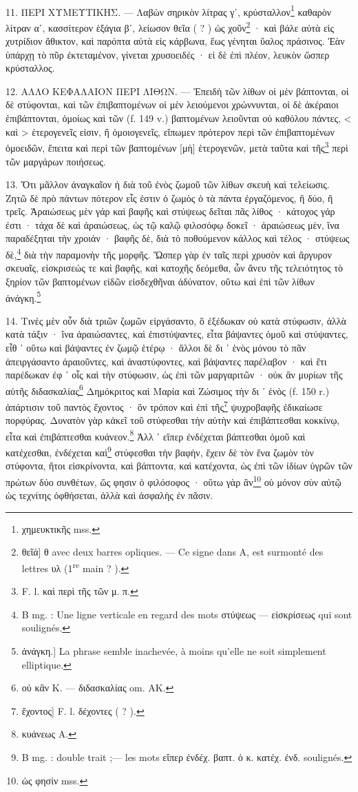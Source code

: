 \documentclass[a4paper, 11pt, oneside, polutonikogreek, french]{article}
\begin{document}
\paragraph{}
11. ΠΕΡΙ ΧΥΜΕΥΤΙΚΗΣ. --- Λαβὼν σηρικὸν λίτρας γʹ, κρύσταλλον\footnote{χημευκτικῆς mss.} καθαρὸν λίτραν αʹ, κασσίτερον ἑξάγια βʹ, λείωσον θεῖα ( ? ) ὡς χοῦν\footnote{θεῖά] θ avec deux barres opliques. --- Ce signe dans A, est surmonté des lettres υλ (1\textsuperscript{re} main ? ).} · καὶ βάλε αὐτὰ εἰς χυτρίδιον ἄθικτον, καὶ παρόπτα αὐτὰ εἰς κάρβωνα, ἕως γένηται ὕαλος πράσινος. Ἐὰν ὑπάρχῃ τὸ πῦρ ἐκτεταμένον, γίνεται χρυσοειδές · εἰ δὲ ἐπὶ πλέον, λευκὸν ὥσπερ κρύσταλλος.

12. ΑΛΛΟ ΚΕΦΑΛΑΙΟΝ ΠΕΡΙ ΛΙΘΩΝ. --- Ἐπειδὴ τῶν λίθων οἱ μὲν βάπτονται, οἱ δὲ στύφονται, καὶ τῶν ἐπιβαπτομένων οἱ μὲν λειούμενοι χρώννυνται, οἱ δὲ ἀκέραιοι ἐπιβάπτονται, ὁμοίως καὶ τῶν (f. 149 v.) βαπτομένων λειοῦνται οὐ καθόλου πάντες, < καὶ > ἑτερογενεῖς εἰσιν, ἢ ὁμοιογενεῖς, εἴπωμεν πρότερον περὶ τῶν ἐπιβαπτομένων ὁμοειδῶν, ἔπειτα καὶ περὶ τῶν βαπτομένων [μὴ] ἑτερογενῶν, μετὰ ταῦτα καὶ τῆς\footnote{F. l. καὶ περὶ τῆς τῶν μ. π.} περὶ τῶν μαργάρων ποιήσεως.

13. Ὅτι μᾶλλον ἀναγκαῖον ἡ διὰ τοῦ ἐνὸς ζωμοῦ τῶν λίθων σκευὴ καὶ τελείωσις. Ζητῶ δὲ πρὸ πάντων πότερον εἷς ἐστιν ὁ ζωμὸς ὁ τὰ πάντα ἐργαζόμενος, ἢ δύο, ἢ τρεῖς. Ἀραιώσεως μὲν γάρ καὶ βαφῆς καὶ στύψεως δεῖται πᾶς λίθος · κάτοχος γάρ ἐστι · τάχα δὲ καὶ ἀραιώσεως, ὡς τῷ καλῷ φιλοσόφῳ δοκεῖ · ἀραιώσεως μὲν, ἵνα παραδέξηται τὴν χροιάν · βαφῆς δὲ, διὰ τὸ ποθούμενον κάλλος καὶ τέλος · στύψεως δὲ,\footnote{B mg. : Une ligne verticale en regard des mots στύψεως --- εἰσκρίσεως qui sont soulignés.} διὰ τὴν παραμονὴν τῆς μορφῆς. Ὥσπερ γὰρ ἐν ταῖς περὶ χρυσὸν καὶ ἄργυρον σκευαῖς, εἰσκρισεώς τε καὶ βαφῆς, καὶ κατοχῆς δεόμεθα, ὧν ἄνευ τῆς τελειότητος τὸ ξηρίον τῶν βαπτομένων εἰδῶν εἰσδεχθῆναι ἀδύνατον, οὕτω καὶ ἐπὶ τῶν λίθων ἀνάγκη.\footnote{ἀνάγκη.] La phrase semble inachevée, à moins qu'elle ne soit simplement elliptique.}

14. Τινὲς μὲν οὖν διὰ τριῶν ζωμῶν εἰργάσαντο, ὃ ἐξέδωκαν οὐ κατὰ στύφωσιν, ἀλλὰ κατὰ τάξιν · ἵνα ἀραιώσαντες, καὶ ἐπιστύψαντες, εἶτα βάψαντες ὁμοῦ καὶ στύψαντες, εἶθ ᾽ οὕτω καὶ βάψαντες ἐν ζωμῷ ἑτέρῳ · ἄλλοι δὲ δι ᾽ ἑνὸς μόνου τὸ πᾶν ἀπειργάσαντο ἀραιοῦντες, καὶ ἀναστύφοντες, καὶ βάψαντες παρέλαβον · καὶ ἔτι παρέδωκαν ἐφ ᾽ οἷς καὶ τὴν στύφωσιν, ὡς ἐπὶ τῶν μαργαριτῶν · οὐκ ἂν μυρίων τῆς αὐτῆς διδασκαλίας\footnote{οὐ κἂν K. --- διδασκαλίας om. AK.} Δημόκριτος καὶ Μαρία καὶ Ζώσιμος τὴν δι ᾽ ἑνὸς (f. 150 r.) ἀπάρτισιν τοῦ παντὸς ἔχοντος · ὃν τρόπον καὶ ἐπὶ τῆς\footnote{ἔχοντος] F. l. δέχοντες ( ? ).} ψυχροβαφῆς ἐδικαίωσε πορφύρας. Δυνατὸν γὰρ κἀκεῖ τοῦ στύφεσθαι τὴν αὐτὴν καὶ ἐπιβάπτεσθαι κοκκίνῳ, εἶτα καὶ ἐπιβάπτεσθαι κυάνεον.\footnote{κυάνεως A.} Ἀλλ ᾽ εἴπερ ἐνδέχεται βάπτεσθαι ὁμοῦ καὶ κατέχεσθαι, ἐνδέχεται καὶ\footnote{B mg. : double trait ;--- les mots εἴπερ ἐνδέχ. βαπτ. ὁ κ. κατέχ. ἐνδ. soulignés.} στύφεσθαι τὴν βαφὴν, ἔχειν δὲ τὸν ἕνα ζωμὸν τὸν στύφοντα, ἤτοι εἰσκρίνοντα, καὶ βάπτοντα, καὶ κατέχοντα, ὡς ἐπὶ τῶν ἰδίων ὑγρῶν τῶν πρώτων δύο συνθέτων, ὥς φησιν ὁ φιλόσοφος · οὕτω γὰρ ἂν\footnote{ὡς φησὶν mss.} οὐ μόνον σὺν αὐτῷ ὡς τεχνίτης ὀφθήσεται, ἀλλὰ καὶ ἀσφαλὴς ἐν πᾶσιν.
\end{document}
